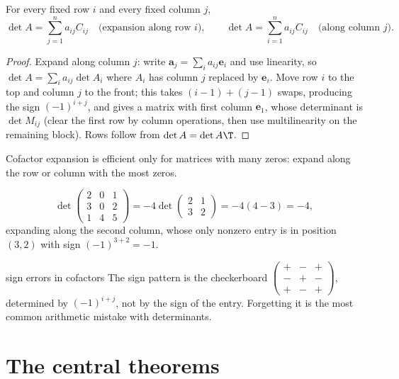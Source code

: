 \begin{theorem}\label{thm:laplace}
For every fixed row $i$ and every fixed column $j$,
\[ \det A=\sum_{j=1}^na_{ij}C_{ij}\quad\text{(expansion along row $i$)},\qquad \det A=\sum_{i=1}^na_{ij}C_{ij}\quad\text{(along column $j$)}. \]
\end{theorem}

\begin{proof}
Expand along column $j$: write $\mathbf{a}_j=\sum_ia_{ij}\mathbf{e}_i$ and use linearity, so $\det A=\sum_ia_{ij}\det A_i$ where $A_i$ has column $j$ replaced by $\mathbf{e}_i$. Move row $i$ to the top and column $j$ to the front; this takes $(i-1)+(j-1)$ swaps, producing the sign $(-1)^{i+j}$, and gives a matrix with first column $\mathbf{e}_1$, whose determinant is $\det M_{ij}$ (clear the first row by column operations, then use multilinearity on the remaining block). Rows follow from $\det A=\det A\T$.
\end{proof}

Cofactor expansion is efficient only for matrices with many zeros: expand along the row or column with the most zeros.

\begin{example}
\[ \det\begin{pmatrix}2&0&1\\3&0&2\\1&4&5\end{pmatrix}=-4\det\begin{pmatrix}2&1\\3&2\end{pmatrix}=-4(4-3)=-4, \]
expanding along the second column, whose only nonzero entry is in position $(3,2)$ with sign $(-1)^{3+2}=-1$.
\end{example}

\begin{pitfall}{sign errors in cofactors}
The sign pattern is the checkerboard $\begin{pmatrix}+&-&+\\-&+&-\\+&-&+\end{pmatrix}$, determined by $(-1)^{i+j}$, not by the sign of the entry. Forgetting it is the most common arithmetic mistake with determinants.
\end{pitfall}

\section{The central theorems}

